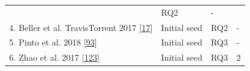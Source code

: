\documentclass[]{book}
\begin{document}
\begin{longtable}[]{@{}llll@{}}
\begin{minipage}[t]{0.18\columnwidth}
\end{minipage} & \begin{minipage}[t]{0.08\columnwidth}\raggedright\strut
RQ2\strut
\end{minipage} & \begin{minipage}[t]{0.06\columnwidth}\raggedright\strut
-\strut
\end{minipage}\tabularnewline
\begin{minipage}[t]{0.56\columnwidth}\raggedright\strut
4. Beller et al. TravisTorrent 2017
{[}\protect\hyperlink{ref-beller2017travistorrent}{17}{]}\strut
\end{minipage} & \begin{minipage}[t]{0.18\columnwidth}\raggedright\strut
Initial seed\strut
\end{minipage} & \begin{minipage}[t]{0.08\columnwidth}\raggedright\strut
RQ2\strut
\end{minipage} & \begin{minipage}[t]{0.06\columnwidth}\raggedright\strut
-\strut
\end{minipage}\tabularnewline
\begin{minipage}[t]{0.56\columnwidth}\raggedright\strut
5. Pinto et al. 2018
{[}\protect\hyperlink{ref-pinto2018work}{93}{]}\strut
\end{minipage} & \begin{minipage}[t]{0.18\columnwidth}\raggedright\strut
Initial seed\strut
\end{minipage} & \begin{minipage}[t]{0.08\columnwidth}\raggedright\strut
RQ3\strut
\end{minipage} & \begin{minipage}[t]{0.06\columnwidth}\raggedright\strut
-\strut
\end{minipage}\tabularnewline
\begin{minipage}[t]{0.56\columnwidth}\raggedright\strut
6. Zhao et al. 2017
{[}\protect\hyperlink{ref-zhao2017impact}{123}{]}\strut
\end{minipage} & \begin{minipage}[t]{0.18\columnwidth}\raggedright\strut
Initial seed\strut
\end{minipage} & \begin{minipage}[t]{0.08\columnwidth}\raggedright\strut
RQ3\strut
\end{minipage} & \begin{minipage}[t]{0.06\columnwidth}\raggedright\strut
2\strut
\end{minipage}\tabularnewline

\end{longtable}
\end{document}
